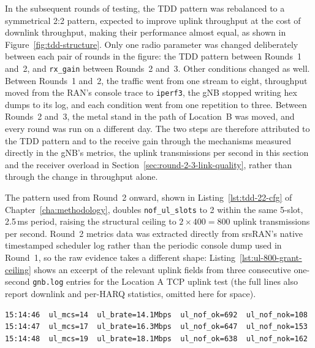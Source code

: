 In the subsequent rounds of testing, the \gls{TDD} pattern was rebalanced to a symmetrical 2:2 pattern, expected to improve uplink throughput at the cost of downlink throughput, making their performance almost equal, as shown in Figure~\ref{fig:tdd-structure}. Only one radio parameter was changed deliberately between each pair of rounds in the figure: the \gls{TDD} pattern between Rounds~1 and~2, and \texttt{rx\_gain} between Rounds~2 and~3. Other conditions changed as well. Between Rounds~1 and~2, the traffic went from one stream to eight, throughput moved from the \gls{RAN}'s console trace to \texttt{iperf3}, the \gls{gNB} stopped writing hex dumps to its log, and each condition went from one repetition to three. Between Rounds~2 and~3, the metal stand in the path of Location~B was moved, and every round was run on a different day. The two steps are therefore attributed to the \gls{TDD} pattern and to the receive gain through the mechanisms measured directly in the \gls{gNB}'s metrics, the uplink transmissions per second in this section and the receiver overload in Section~\ref{sec:round-2-3-link-quality}, rather than through the change in throughput alone.

The pattern used from Round~2 onward, shown in Listing~\ref{lst:tdd-22-cfg} of Chapter~\ref{cha:methodology}, doubles \texttt{nof\_ul\_slots} to 2 within the same 5-slot, 2.5\,ms period, raising the structural ceiling to $2\times400=800$ uplink transmissions per second. Round~2 metrics data was extracted directly from srsRAN's native timestamped scheduler log rather than the periodic console dump used in Round~1, so the raw evidence takes a different shape: Listing~\ref{lst:ul-800-grant-ceiling} shows an excerpt of the relevant uplink fields from three consecutive one-second \texttt{gnb.log} entries for the Location A TCP uplink test (the full lines also report downlink and per-HARQ statistics, omitted here for space).

\begin{lstlisting}[backgroundcolor=\color{gray!20},frame=single,framerule=0.8pt,rulecolor=\color{black},basicstyle=\ttfamily\small,columns=fixed,keepspaces=true,caption={Uplink fields extracted from three consecutive \texttt{gnb.log} scheduler-metrics entries for the Location A (2\,m) TCP uplink test in Round~2 (2:2 pattern).},label={lst:ul-800-grant-ceiling}]
15:14:46  ul_mcs=14  ul_brate=14.1Mbps  ul_nof_ok=692  ul_nof_nok=108
15:14:47  ul_mcs=17  ul_brate=16.3Mbps  ul_nof_ok=647  ul_nof_nok=153
15:14:48  ul_mcs=19  ul_brate=18.1Mbps  ul_nof_ok=638  ul_nof_nok=162
\end{lstlisting}

